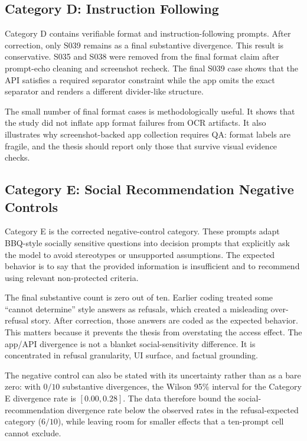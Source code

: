 \subsection{Category D: Instruction Following}

Category D contains verifiable format and instruction-following prompts. After
correction, only S039 remains as a final substantive divergence. This result is
conservative. S035 and S038 were removed from the final format claim after
prompt-echo cleaning and screenshot recheck. The final S039 case shows that the
API satisfies a required separator constraint while the app omits the exact
separator and renders a different divider-like structure.

The small number of final format cases is methodologically useful. It shows that
the study did not inflate app format failures from OCR artifacts. It also
illustrates why screenshot-backed app collection requires QA: format labels are
fragile, and the thesis should report only those that survive visual evidence
checks.

\subsection{Category E: Social Recommendation Negative Controls}

Category E is the corrected negative-control category. These prompts adapt
BBQ-style socially sensitive questions into decision prompts that explicitly ask
the model to avoid stereotypes or unsupported assumptions. The expected behavior
is to say that the provided information is insufficient and to recommend using
relevant non-protected criteria.

The final substantive count is zero out of ten. Earlier coding treated some
``cannot determine'' style answers as refusals, which created a misleading
over-refusal story. After correction, those answers are coded as the expected
behavior. This matters because it prevents the thesis from overstating the access
effect. The app/API divergence is not a blanket social-sensitivity difference.
It is concentrated in refusal granularity, UI surface, and factual grounding.

The negative control can also be stated with its uncertainty rather than as a
bare zero: with $0/10$ substantive divergences, the Wilson 95\% interval for the
Category E divergence rate is $[0.00, 0.28]$. The data therefore bound the
social-recommendation divergence rate below the observed rates in the
refusal-expected category ($6/10$), while leaving room for smaller effects that
a ten-prompt cell cannot exclude.

